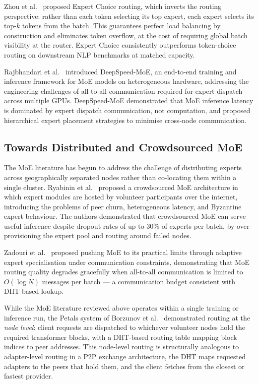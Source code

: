 Zhou et al.~\cite{Zhou2022} proposed Expert Choice routing, which inverts the routing perspective:
rather than each token selecting its top expert, each expert selects its top-$k$ tokens
from the batch. This guarantees perfect load balancing by construction and eliminates
token overflow, at the cost of requiring global batch visibility at the router.
Expert Choice consistently outperforms token-choice routing on downstream NLP benchmarks
at matched capacity.

Rajbhandari et al.~\cite{RajbhandariDeepSpeed2022} introduced DeepSpeed-MoE, an end-to-end training and
inference framework for MoE models on heterogeneous hardware, addressing the engineering
challenges of all-to-all communication required for expert dispatch across multiple GPUs.
DeepSpeed-MoE demonstrated that MoE inference latency is dominated by expert dispatch
communication, not computation, and proposed hierarchical expert placement strategies
to minimise cross-node communication.

\subsection{Towards Distributed and Crowdsourced MoE}
\label{sec:moe_routing:distributed}

The MoE literature has begun to address the challenge of distributing experts across
geographically separated nodes rather than co-locating them within a single cluster.
Ryabinin et al.~\cite{RyabininCrowdsourced2020} proposed a crowdsourced MoE architecture in which
expert modules are hosted by volunteer participants over the internet, introducing
the problems of peer churn, heterogeneous latency, and Byzantine expert behaviour.
The authors demonstrated that crowdsourced MoE can serve useful inference despite
dropout rates of up to 30\% of experts per batch, by over-provisioning the expert
pool and routing around failed nodes.

Zadouri et al.~\cite{ZadouriPushMoE2024} proposed pushing MoE to its practical limits through
adaptive expert specialisation under communication constraints, demonstrating that
MoE routing quality degrades gracefully when all-to-all communication is limited
to $O(\log N)$ messages per batch --- a communication budget consistent with DHT-based
lookup.

While the MoE literature reviewed above operates within a single training or inference
run, the Petals system of Borzunov et al.~\cite{Borzunov2023} demonstrated routing at the
\textit{node level}: client requests are dispatched to whichever volunteer nodes
hold the required transformer blocks, with a DHT-based routing table mapping block
indices to peer addresses. This node-level routing is structurally analogous to
adapter-level routing in a P2P exchange architecture, the DHT maps requested adapters to
the peers that hold them, and the client fetches from the closest or fastest provider.

